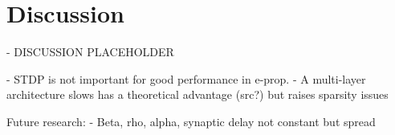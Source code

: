\chapter{Discussion}\label{ch:discussion}


\begin{tcolorbox}[colback=orange]
- DISCUSSION PLACEHOLDER

- STDP is not important for good performance in e-prop.
- A multi-layer architecture slows has a theoretical advantage (src?) but raises sparsity issues
\end{tcolorbox}


\begin{tcolorbox}[colback=orange]
Future research:
- Beta, rho, alpha, synaptic delay not constant but spread
\end{tcolorbox}
